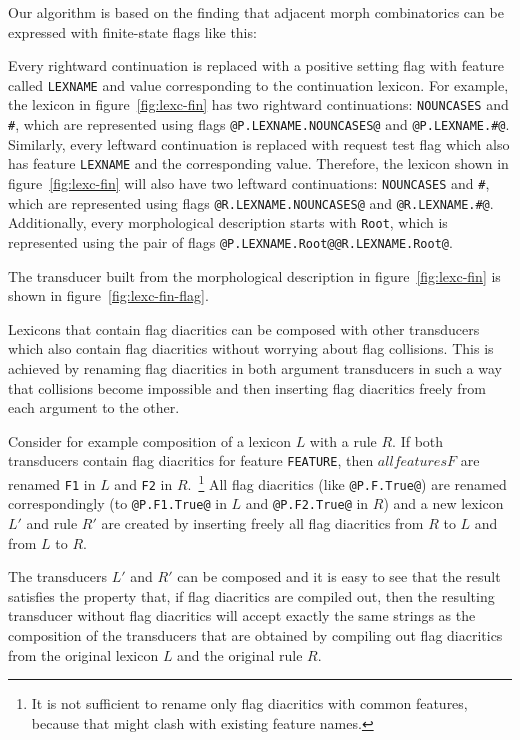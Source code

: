 \documentclass[11pt]{article}
\begin{document}
Our algorithm is based on the finding that adjacent morph combinatorics can be expressed with finite-state flags like this:

Every rightward continuation is replaced with a positive setting flag
with feature called \texttt{LEXNAME} and value corresponding to the
continuation lexicon. For example, the lexicon in
figure~\ref{fig:lexc-fin} has two rightward continuations:
\texttt{NOUNCASES} and \texttt{\#}, which are represented using flags
\verb+@P.LEXNAME.NOUNCASES@+ and \verb+@P.LEXNAME.#@+.  Similarly,
every leftward continuation is replaced with request test flag which
also has feature \texttt{LEXNAME} and the corresponding
value. Therefore, the lexicon shown in figure~\ref{fig:lexc-fin} will
also have two leftward continuations: \texttt{NOUNCASES} and
\texttt{\#}, which are represented using flags
\verb+@R.LEXNAME.NOUNCASES@+ and \verb+@R.LEXNAME.#@+. Additionally,
every morphological description starts with \texttt{Root}, which is
represented using the pair of flags
\verb+@P.LEXNAME.Root@@R.LEXNAME.Root@+.

The transducer built from the morphological description in
figure~\ref{fig:lexc-fin} is shown in figure~\ref{fig:lexc-fin-flag}.


Lexicons that contain flag diacritics can be composed with other
transducers which also contain flag diacritics without worrying about
flag collisions. This is achieved by renaming flag diacritics in both
argument transducers in such a way that collisions become impossible
and then inserting flag diacritics freely from each argument to the
other.

Consider for example composition of a lexicon $L$ with a rule $R$. If
both transducers contain flag diacritics for feature {\tt FEATURE},
then $all features F$ are renamed {\tt F1} in $L$ and {\tt F2} in
$R$.~\footnote{It is not sufficient to rename only flag diacritics
  with common features, because that might clash with existing feature
  names.} All flag diacritics (like {\tt @P.F.True@}) are renamed
correspondingly (to {\tt @P.F1.True@} in $L$ and {\tt @P.F2.True@} in
$R$) and a new lexicon $L'$ and rule $R'$ are created by inserting
freely all flag diacritics from $R$ to $L$ and from $L$ to $R$.

The transducers $L'$ and $R'$ can be composed and it is easy to
see that the result satisfies the property that, if flag diacritics
are compiled out, then the resulting transducer without flag
diacritics will accept exactly the same strings as the composition of
the transducers that are obtained by compiling out flag diacritics
from the original lexicon $L$ and the original rule $R$.
\end{document}
